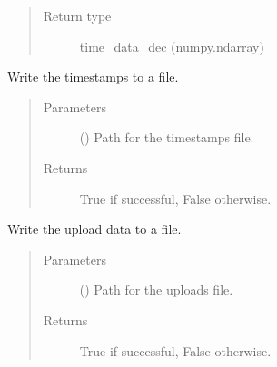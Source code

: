 \documentclass[letterpaper,10pt,english]{sphinxmanual}
\begin{document}
\begin{fulllineitems}
\begin{fulllineitems}
\begin{quote}
\begin{description}
\begin{description}
\end{description}


\item[{Return type}] \leavevmode
time\_data\_dec (numpy.ndarray)

\end{description}\end{quote}

\end{fulllineitems}


\begin{fulllineitems}
\label{\detokenize{src:src.timer.TimeIt.write_time_data}}
Write the timestamps to a file.
\begin{quote}\begin{description}
\item[{Parameters}] \leavevmode
{} () \textendash{} Path for the timestamps file.

\item[{Returns}] \leavevmode
True if successful, False otherwise.

\end{description}\end{quote}

\end{fulllineitems}


\begin{fulllineitems}
\label{\detokenize{src:src.timer.TimeIt.write_upload_data}}
Write the upload data to a file.
\begin{quote}\begin{description}
\item[{Parameters}] \leavevmode
{} () \textendash{} Path for the uploads file.

\item[{Returns}] \leavevmode
True if successful, False otherwise.

\end{description}\end{quote}

\end{fulllineitems}


\end{fulllineitems}
\end{document}
